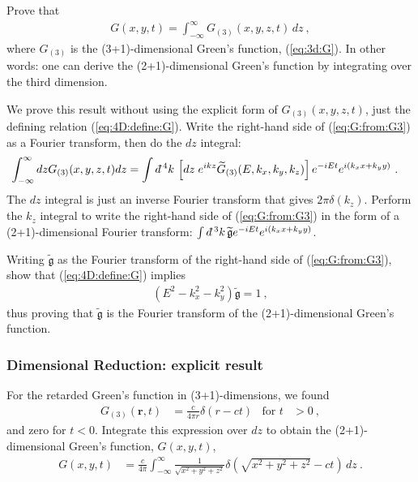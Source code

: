 \documentclass[12pt]{article}
\numberwithin{equation}{subsection}    %
\renewcommand{\tilde}{\widetilde}   %
\renewcommand{\vec}[1]{\mathbf{#1}} %
\newcommand{\dbar}{d\mkern-6mu\mathchar'26}    %
\begin{document}
Prove that 
\begin{align}
	G(x,y,t) = \int_{-\infty}^\infty G_{(3)}(x,y,z,t) \, dz \ ,
	\label{eq:G:from:G3}
\end{align}
where $G_{(3)}$ is the (3+1)-dimensional Green's function, (\ref{eq:3d:G}). In other words: one can derive the (2+1)-dimensional Green's function by integrating over the third dimension.

We prove this result without using the explicit form of $G_{(3)}(x,y,z,t)$, just the defining relation (\ref{eq:4D:define:G}). Write the right-hand side of (\ref{eq:G:from:G3}) as a Fourier transform, then do the $dz$ integral:
\begin{align}
	\int_{-\infty}^\infty dz G_{(3)}(x,y,z,t)dz
	&=
	\int \dbar^4k \,
	\left[dz\; e^{ikz} \tilde G_{(3)}(E,k_x, k_y, k_z)\right]
	 e^{-iEt} e^{i(k_xx + k_y y)} \ .
\end{align}
The $dz$ integral is just an inverse Fourier transform that gives $2\pi\delta(k_z)$. Perform the $k_z$ integral to write the right-hand side of (\ref{eq:G:from:G3}) in the form of a (2+1)-dimensional Fourier transform: $\int \dbar^3 k \, \tilde{\mathfrak{g}}e^{-iEt}e^{i(k_xx+k_yy)}$. 

Writing $\tilde{\mathfrak{g}}$ as the Fourier transform of the right-hand side of (\ref{eq:G:from:G3}), show that (\ref{eq:4D:define:G}) implies
\begin{align}
	\left(E^2 - k_x^2 - k_y^2\right) \tilde{\mathfrak{g}} = 1\ ,
\end{align}
thus proving that $\tilde{\mathfrak{g}}$ is the Fourier transform of the (2+1)-dimensional Green's function.

\subsubsection{Dimensional Reduction: explicit result}

For the retarded Green's function in (3+1)-dimensions, we found
\begin{align}
	G_{(3)}(\vec r,t) &= \frac{c}{4\pi r} \delta(r-ct)
	&
	\text{for } t&>0 \ ,
\end{align}
and zero for $t<0$. Integrate this expression over $dz$ to obtain the (2+1)-dimensional Green's function, $G(x,y,t)$,
\begin{align}
	G(x,y,t) &= \frac{c}{4\pi} \int_{-\infty}^\infty 
	\frac{1}{\sqrt{x^2+y^2 + z^2}} \delta\left(\sqrt{x^2+y^2 + z^2} - ct\right) \, dz \ .
\end{align}
\end{document}
